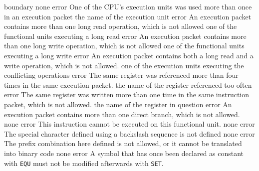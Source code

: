 \documentclass[12pt,twoside]{report}
\begin{document}
\begin{description}
{                boundary}
               {none}
               {error}
               {One of the CPU's execution units was used more than
                once in an execution packet}
               {the name of the execution unit}
               {error}
               {An execution packet contains more than one long read
                operation, which is not allowed}
               {one of the functional units executing a long read}
               {error}
               {An execution packet contains more than one long write
                operation, which is not allowed}
               {one of the functional units executing a long write}
               {error}
               {An execution packet contains both a long read and a write
                operation, which is not allowed.}
               {one of the execution units executing the conflicting
                operations}
               {error}
               {The same register was referenced more than four times in
                the same execution packet.}
               {the name of the register referenced too often}
               {error}
               {The same register was written more than one time in the
                same instruction packet, which is not allowed.}
               {the name of the register in question}
               {error}
               {An execution packet contains more than one direct branch,
                which is not allowed.}
               {none}
               {error}
               {This instruction cannot be executed on this functional
                unit.}
               {none}
               {error}
               {The special character defined using a backslash sequence
                is not defined}
               {none}
               {error}
               {The prefix combination here defined is not allowed, or it
                cannot be translated into binary code}
               {none}
               {error}
               {A symbol that has once been declared as constant with
                {\tt EQU} must not be modified afterwards with {\tt SET}.}

\end{description}
\end{document}
